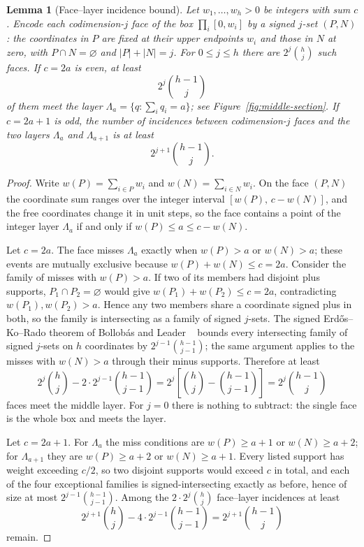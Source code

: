 \documentclass[pdflatex,sn-mathphys-num]{sn-jnl}
\theoremstyle{thmstyleone}
\newtheorem{lemma}[theorem]{Lemma}
\theoremstyle{thmstylethree}
\theoremstyle{thmstyletwo}
\begin{document}
\begin{lemma}[Face--layer incidence bound]
\label{lem:face-incidence}
Let $w_1,\ldots,w_h>0$ be integers with sum $c$.  Encode each
codimension-$j$ face of the box $\prod_i[0,w_i]$ by a signed $j$-set
$(P,N)$: the coordinates in $P$ are fixed at their upper endpoints $w_i$ and
those in $N$ at zero, with $P\cap N=\varnothing$ and $|P|+|N|=j$.  For
$0\le j\le h$ there are $2^j\binom hj$ such faces.  If $c=2a$ is even, at
least
\[
 2^j\binom{h-1}j
\]
of them meet the layer $\Lambda_a=\{q:\sum_iq_i=a\}$; see
Figure~\ref{fig:middle-section}.  If $c=2a+1$ is odd,
the number of incidences between codimension-$j$ faces and the two layers
$\Lambda_a$ and $\Lambda_{a+1}$ is at least
\[
 2^{j+1}\binom{h-1}j.
\]
\end{lemma}

\begin{proof}
Write $w(P)=\sum_{i\in P}w_i$ and $w(N)=\sum_{i\in N}w_i$.  On the face
$(P,N)$ the coordinate sum ranges over the integer interval
$[w(P),\,c-w(N)]$, and the free coordinates change it in unit steps, so the
face contains a point of the integer layer $\Lambda_a$ if and only if
$w(P)\le a\le c-w(N)$.

Let $c=2a$.  The face misses $\Lambda_a$ exactly when $w(P)>a$ or
$w(N)>a$; these events are mutually exclusive because
$w(P)+w(N)\le c=2a$.  Consider the family of misses with $w(P)>a$.  If two
of its members had disjoint plus supports, $P_1\cap P_2=\varnothing$ would
give $w(P_1)+w(P_2)\le c=2a$, contradicting $w(P_1),w(P_2)>a$.  Hence any
two members share a coordinate signed plus in both, so the family is
intersecting as a family of signed $j$-sets.  The signed
Erd\H{o}s--Ko--Rado theorem of Bollob\'as and Leader
~\cite{BollobasLeaderSigned97} bounds every intersecting family of signed
$j$-sets on $h$ coordinates by $2^{j-1}\binom{h-1}{j-1}$; the same argument
applies to the misses with $w(N)>a$ through their minus supports.
Therefore at least
\[
 2^j\binom hj-2\cdot2^{j-1}\binom{h-1}{j-1}
 =2^j\left[\binom hj-\binom{h-1}{j-1}\right]
 =2^j\binom{h-1}j
\]
faces meet the middle layer.  For $j=0$ there is nothing to subtract: the
single face is the whole box and meets the layer.

Let $c=2a+1$.  For $\Lambda_a$ the miss conditions are $w(P)\ge a+1$ or
$w(N)\ge a+2$; for $\Lambda_{a+1}$ they are $w(P)\ge a+2$ or
$w(N)\ge a+1$.  Every listed support has weight exceeding $c/2$, so two
disjoint supports would exceed $c$ in total, and each of the four
exceptional families is signed-intersecting exactly as before, hence of size
at most $2^{j-1}\binom{h-1}{j-1}$.  Among the $2\cdot2^j\binom hj$
face--layer incidences at least
\[
 2^{j+1}\binom hj
 -4\cdot2^{j-1}\binom{h-1}{j-1}
 =2^{j+1}\binom{h-1}j
\]
remain.
\end{proof}
\end{document}
